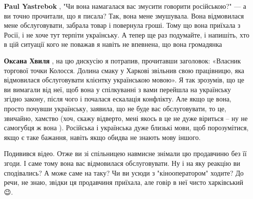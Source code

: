 \begin{itemize}
\begin{itemize}
 
\textbf{Paul Yastrebok} , "Чи вона намагалася вас змусити говорити російською?"
— а ви точно прочитали, що я писала? Так, вона мене змушувала. Вона відмовилася
мене обслуговувати, забрала товар і повернула гроші. Тому що вона приїхала з
Росії, і не хоче тут терпіти українську. А тепер ще раз подумайте, і напишіть,
хто в цій ситуації кого не поважав я навіть не впевнена, що вона громадянка

 
\textbf{Оксана Хвиля} , на цю дискусію я потрапив, прочитавши заголовок:
«Власник торгової точки Колосся. Долина смаку у Харкові звільнив свою
працівницю, яка відмовилася обслуговувати клієнтку українською мовою». Я так
зрозумів, що це ви вимагали від неї, щоб вона у спілкуванні з вами перейшла на
українську згідно закону, після чого і почалася ескалація конфлікту. Але якщо
це вона, просто почувши українську, заявила, що не буде вас обслуговувати, то
це, звичайно, хамство (хоч, скажу відверто, мені якось в це не дуже віриться –
ну не самогубця ж вона \Smiley[1.0][yellow]). Російська і українська дуже близькі мови, щоб
порозумітися, якщо є таке бажання, навіть якщо обидва не знають мову іншого.

 

Подивився відео. Отже ви зі спільницею навмисне знімали цю продавчиню без її
згоди. І саме тому вона вас відмовилася обслуговувати. Ну і на яку реакцію ви
сподівались? А може саме на таку? Чи ви усюди з "кінооператором" ходите? До
речи, не знаю, звідки ця продавчиня приїхала, але говір в неї чисто харківський
😉.
\end{itemize}

 

\end{itemize}
